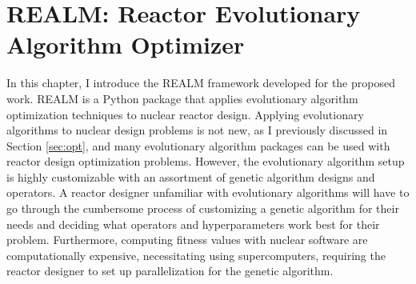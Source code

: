 \chapter{REALM: Reactor Evolutionary Algorithm Optimizer}

In this chapter, I introduce the \gls{REALM} framework developed for the
proposed work.
\gls{REALM} is a Python package that applies evolutionary algorithm 
optimization techniques to nuclear reactor design. 
Applying evolutionary algorithms to nuclear design problems is not new, as I
previously discussed in Section \ref{sec:opt}, and many evolutionary algorithm 
packages can be used with reactor design optimization problems. 
However, the evolutionary algorithm setup is highly customizable with
an assortment of genetic algorithm designs and operators.
A reactor designer unfamiliar with evolutionary algorithms will have
to go through the cumbersome process of customizing a genetic algorithm 
for their needs and deciding what operators and hyperparameters work best for 
their problem. 
Furthermore, computing fitness values with nuclear software are computationally 
expensive, necessitating using supercomputers, requiring the reactor designer to 
set up parallelization for the genetic algorithm.

